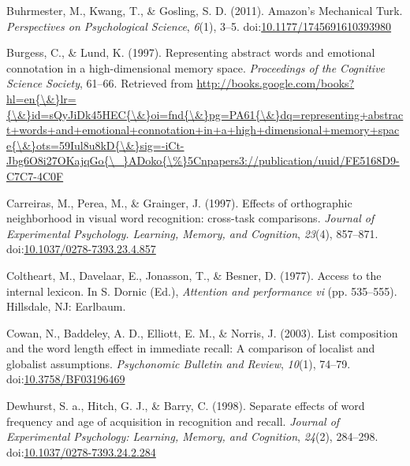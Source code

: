 \documentclass[english,man]{apa6}
\theoremstyle{definition}
\theoremstyle{definition}
\theoremstyle{definition}
\theoremstyle{remark}
\begin{document}
\hypertarget{ref-Buhrmester2011}{}
Buhrmester, M., Kwang, T., \& Gosling, S. D. (2011). Amazon's Mechanical
Turk. \emph{Perspectives on Psychological Science}, \emph{6}(1), 3--5.
doi:\href{https://doi.org/10.1177/1745691610393980}{10.1177/1745691610393980}

\hypertarget{ref-Burgess1997}{}
Burgess, C., \& Lund, K. (1997). Representing abstract words and
emotional connotation in a high-dimensional memory space.
\emph{Proceedings of the Cognitive Science Society}, 61--66. Retrieved
from
\href{http://books.google.com/books?hl=en\%7B/\&\%7Dlr=\%7B/\&\%7Did=sQyJiDk45HEC\%7B/\&\%7Doi=fnd\%7B/\&\%7Dpg=PA61\%7B/\&\%7Ddq=representing+abstract+words+and+emotional+connotation+in+a+high+dimensional+memory+space\%7B/\&\%7Dots=59Iul8u8kD\%7B/\&\%7Dsig=-iCt-Jbg6O8i27OKajqGo\%7B/_\%7DADoko\%7B/\%\%7D5Cnpapers3://publication/uuid/FE5168D9-C7C7-4C0F}{http://books.google.com/books?hl=en\{\textbackslash{}\&\}lr=\{\textbackslash{}\&\}id=sQyJiDk45HEC\{\textbackslash{}\&\}oi=fnd\{\textbackslash{}\&\}pg=PA61\{\textbackslash{}\&\}dq=representing+abstract+words+and+emotional+connotation+in+a+high+dimensional+memory+space\{\textbackslash{}\&\}ots=59Iul8u8kD\{\textbackslash{}\&\}sig=-iCt-Jbg6O8i27OKajqGo\{\textbackslash{}\_\}ADoko\{\textbackslash{}\%\}5Cnpapers3://publication/uuid/FE5168D9-C7C7-4C0F}

\hypertarget{ref-Carreiras1997}{}
Carreiras, M., Perea, M., \& Grainger, J. (1997). Effects of
orthographic neighborhood in visual word recognition: cross-task
comparisons. \emph{Journal of Experimental Psychology. Learning, Memory,
and Cognition}, \emph{23}(4), 857--871.
doi:\href{https://doi.org/10.1037/0278-7393.23.4.857}{10.1037/0278-7393.23.4.857}

\hypertarget{ref-Coltheart1977}{}
Coltheart, M., Davelaar, E., Jonasson, T., \& Besner, D. (1977). Access
to the internal lexicon. In S. Dornic (Ed.), \emph{Attention and
performance vi} (pp. 535--555). Hillsdale, NJ: Earlbaum.

\hypertarget{ref-Cowan2003}{}
Cowan, N., Baddeley, A. D., Elliott, E. M., \& Norris, J. (2003). List
composition and the word length effect in immediate recall: A comparison
of localist and globalist assumptions. \emph{Psychonomic Bulletin and
Review}, \emph{10}(1), 74--79.
doi:\href{https://doi.org/10.3758/BF03196469}{10.3758/BF03196469}

\hypertarget{ref-Dewhurst1998}{}
Dewhurst, S. a., Hitch, G. J., \& Barry, C. (1998). Separate effects of
word frequency and age of acquisition in recognition and recall.
\emph{Journal of Experimental Psychology: Learning, Memory, and
Cognition}, \emph{24}(2), 284--298.
doi:\href{https://doi.org/10.1037/0278-7393.24.2.284}{10.1037/0278-7393.24.2.284}
\end{document}
